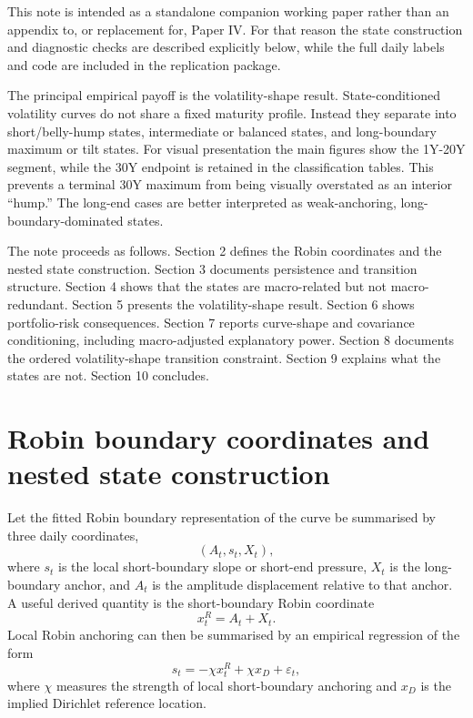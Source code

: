 \documentclass[11pt]{article}
\begin{document}
This note is intended as a standalone companion working paper rather than an appendix to, or replacement for, Paper IV. For that reason the state construction and diagnostic checks are described explicitly below, while the full daily labels and code are included in the replication package.

The principal empirical payoff is the volatility-shape result. State-conditioned volatility curves do not share a fixed maturity profile. Instead they separate into short/belly-hump states, intermediate or balanced states, and long-boundary maximum or tilt states. For visual presentation the main figures show the 1Y-20Y segment, while the 30Y endpoint is retained in the classification tables. This prevents a terminal 30Y maximum from being visually overstated as an interior ``hump.'' The long-end cases are better interpreted as weak-anchoring, long-boundary-dominated states.

The note proceeds as follows. Section 2 defines the Robin coordinates and the nested state construction. Section 3 documents persistence and transition structure. Section 4 shows that the states are macro-related but not macro-redundant. Section 5 presents the volatility-shape result. Section 6 shows portfolio-risk consequences. Section 7 reports curve-shape and covariance conditioning, including macro-adjusted explanatory power. Section 8 documents the ordered volatility-shape transition constraint. Section 9 explains what the states are not. Section 10 concludes.

\section{Robin boundary coordinates and nested state construction}

Let the fitted Robin boundary representation of the curve be summarised by three daily coordinates,
\[
(A_t,s_t,X_t),
\]
where $s_t$ is the local short-boundary slope or short-end pressure, $X_t$ is the long-boundary anchor, and $A_t$ is the amplitude displacement relative to that anchor. A useful derived quantity is the short-boundary Robin coordinate
\[
x^R_t = A_t + X_t.
\]
Local Robin anchoring can then be summarised by an empirical regression of the form
\begin{equation}
 s_t = -\chi x^R_t + \chi x_D + \varepsilon_t,
\end{equation}
where $\chi$ measures the strength of local short-boundary anchoring and $x_D$ is the implied Dirichlet reference location.
\end{document}
